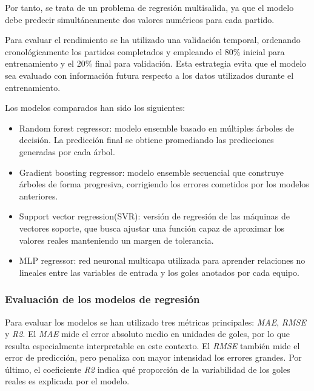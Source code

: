 Por tanto, se trata de un problema de regresión multisalida, ya que el modelo debe predecir simultáneamente dos valores numéricos para cada partido.

Para evaluar el rendimiento se ha utilizado una validación temporal, ordenando cronológicamente los partidos completados y empleando el 80\% inicial para entrenamiento y el 20\% final para validación. Esta estrategia evita que el modelo sea evaluado con información futura respecto a los datos utilizados durante el entrenamiento.

Los modelos comparados han sido los siguientes:

\begin{itemize}
    \item {Random forest regressor}: modelo ensemble basado en múltiples árboles
    de decisión. La predicción final se obtiene promediando las predicciones generadas
    por cada árbol.

    \item {Gradient boosting regressor}: modelo ensemble secuencial que construye
    árboles de forma progresiva, corrigiendo los errores cometidos por los modelos
    anteriores.

    \item {Support vector regression(SVR)}: versión de regresión de las máquinas de
    vectores soporte, que busca ajustar una función capaz de aproximar los valores
    reales manteniendo un margen de tolerancia.

    \item {MLP regressor}: red neuronal multicapa utilizada para aprender
    relaciones no lineales entre las variables de entrada y los goles anotados por cada
    equipo.
\end{itemize}

\subsubsection{Evaluación de los modelos de regresión}

Para evaluar los modelos se han utilizado tres métricas principales: \textit{MAE}, \textit{RMSE} y \textit{R2}. El \textit{MAE} mide el error absoluto medio en unidades de goles, por lo que resulta especialmente interpretable en este contexto. El \textit{RMSE} también mide el error de predicción, pero penaliza con mayor intensidad los errores
grandes. Por último, el coeficiente \textit{R2} indica qué proporción de la variabilidad de los goles reales es explicada por el modelo.


